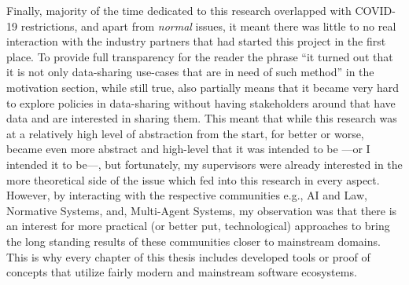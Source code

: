 Finally, majority of the time dedicated to this research overlapped with COVID-19 restrictions, and apart from \textit{normal} issues, it meant there was little to no real interaction with the industry partners that had started this project in the first place. To provide full transparency for the reader the phrase ``it turned out that it is not only data-sharing use-cases that are in need of such method'' in the motivation section, while still true, also partially means that it became very hard to explore policies in data-sharing without having stakeholders around that have data and are interested in sharing them.  This meant that while this research was at a relatively high level of abstraction from the start, for better or worse, became even more abstract and high-level that it was intended to be ---or I intended it to be---, but fortunately, my supervisors were already interested in the more theoretical side of the issue \cite{Tom,Giovanni} which fed into this research in every aspect. However, by interacting with the respective communities e.g., AI and Law, Normative Systems, and, Multi-Agent Systems, my observation was that there is an interest for more practical (or better put, technological) approaches to bring the long standing results of these communities closer to mainstream domains. This is why every chapter of this thesis includes developed tools or proof of concepts that utilize fairly modern and mainstream software ecosystems.  



